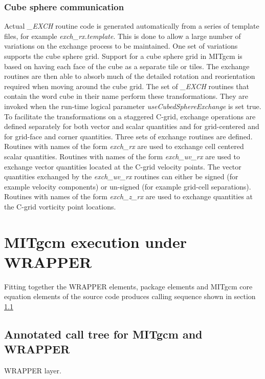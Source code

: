 \subsubsection{Cube sphere communication}
\label{sect:cube_sphere_communication}
Actual {\em \_EXCH} routine code is generated automatically from 
a series of template files, for example {\em exch\_rx.template}.
This is done to allow a large number of variations on the exchange 
process to be maintained. One set of variations supports the
cube sphere grid. Support for a cube sphere grid in MITgcm is based
on having each face of the cube as a separate tile or tiles.
The exchange routines are then able to absorb much of the
detailed rotation and reorientation required when moving around the
cube grid. The set of {\em \_EXCH} routines that contain the
word cube in their name perform these transformations.
They are invoked when the run-time logical parameter
{\em useCubedSphereExchange} is set true. To facilitate the
transformations on a staggered C-grid, exchange operations are defined 
separately for both vector and scalar quantities and for
grid-centered and for grid-face and corner quantities.
Three sets of exchange routines are defined. Routines
with names of the form {\em exch\_rx} are used to exchange
cell centered scalar quantities. Routines with names of the form
{\em exch\_uv\_rx} are used to exchange vector quantities located at
the C-grid velocity points. The vector quantities exchanged by the 
{\em exch\_uv\_rx} routines can either be signed (for example velocity 
components) or un-signed (for example grid-cell separations).
Routines with names of the form {\em exch\_z\_rx} are used to exchange 
quantities at the C-grid vorticity point locations.




\section{MITgcm execution under WRAPPER}

Fitting together the WRAPPER elements, package elements and
MITgcm core equation elements of the source code produces calling
sequence shown in section \ref{sect:calling_sequence}

\subsection{Annotated call tree for MITgcm and WRAPPER}
\label{sect:calling_sequence}

WRAPPER layer.

